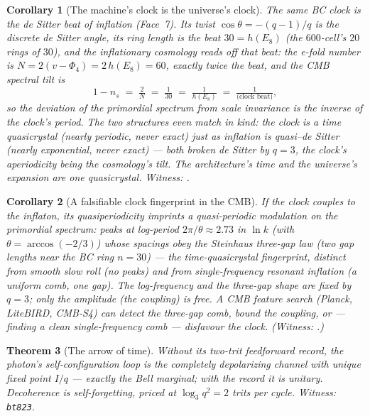 \documentclass[11pt]{article}
\newtheorem{theorem}{Theorem}[section]
\newtheorem{corollary}[theorem]{Corollary}
\begin{document}
\begin{corollary}[The machine's clock is the universe's clock]
The same BC clock is the de Sitter beat of inflation (Face~7). Its twist
$\cos\theta=-(q-1)/q$ is the discrete de Sitter angle, its ring length is the beat
$30=h(E_8)$ (the $600$-cell's $20$ rings of $30$), and the inflationary cosmology reads
off that beat: the e-fold number is $N=2(v-\Phi_4)=2\,h(E_8)=60$, exactly twice the
beat, and the CMB spectral tilt is
\[
1-n_s \;=\; \tfrac{2}{N} \;=\; \tfrac1{30} \;=\; \tfrac1{h(E_8)} \;=\; \tfrac1{\text{(clock beat)}},
\]
so the deviation of the primordial spectrum from scale invariance is the inverse of the
clock's period. The two structures even match in kind: the clock is a \emph{time
quasicrystal} (nearly periodic, never exact) just as inflation is \emph{quasi--de
Sitter} (nearly exponential, never exact) --- both broken de Sitter by $q=3$, the clock's
aperiodicity being the cosmology's tilt. The architecture's time and the universe's
expansion are one quasicrystal.
\emph{Witness: .}
\end{corollary}

\begin{corollary}[A falsifiable clock fingerprint in the CMB]
If the clock couples to the inflaton, its quasiperiodicity imprints a \emph{quasi-periodic}
modulation on the primordial spectrum: peaks at log-period $2\pi/\theta\approx2.73$ in
$\ln k$ (with $\theta=\arccos(-2/3)$) whose spacings obey the Steinhaus \emph{three-gap}
law (two gap lengths near the BC ring $n=30$) --- the time-quasicrystal fingerprint,
distinct from smooth slow roll (no peaks) and from single-frequency resonant inflation (a
uniform comb, one gap). The log-frequency and the three-gap shape are fixed by $q=3$; only
the amplitude (the coupling) is free. A CMB feature search (Planck, LiteBIRD, CMB-S4) can
detect the three-gap comb, bound the coupling, or --- finding a clean single-frequency
comb --- disfavour the clock. (Witness:
.)
\end{corollary}

\begin{theorem}[The arrow of time]
Without its two-trit feedforward record, the photon's
self-configuration loop is the completely depolarizing channel with
unique fixed point $I/q$ --- exactly the Bell marginal; with the
record it is unitary.  Decoherence is self-forgetting, priced at
$\log_3 q^2 = 2$ trits per cycle.
\emph{Witness: \texttt{bt823}.}
\end{theorem}
\end{document}
